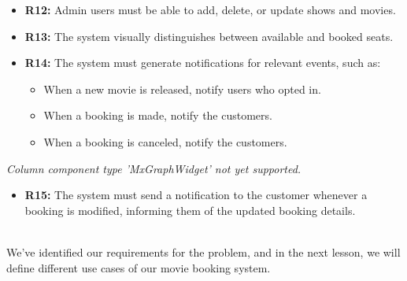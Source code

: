 \noindent
\begin{minipage}[t]{0.48\textwidth}\vspace{0pt}
\begin{itemize}
\item
\textbf{R12:} Admin users must be able to add, delete, or update shows and movies.
\item
\textbf{R13:} The system visually distinguishes between available and booked seats.
\item
\textbf{R14:} The system must generate notifications for relevant events, such as:

\begin{itemize}
\item
When a new movie is released, notify users who opted in.
\item
When a booking is made, notify the customers.
\item
When a booking is canceled, notify the customers.
\end{itemize}
\end{itemize}
\end{minipage}
\hfill
\begin{minipage}[t]{0.48\textwidth}\vspace{0pt}
\textit{Column component type 'MxGraphWidget' not yet supported.}
\end{minipage}

\begin{itemize}
\item
\protect{}\label{SY-0yyxWHMB2Wp2rT-4Zw}
\textbf{R15:} The system must send a notification to the customer whenever a booking is modified, informing them of the updated booking details.
\end{itemize}
\\
We've identified our requirements for the problem, and in the next lesson, we will define different use cases of our movie booking system.

